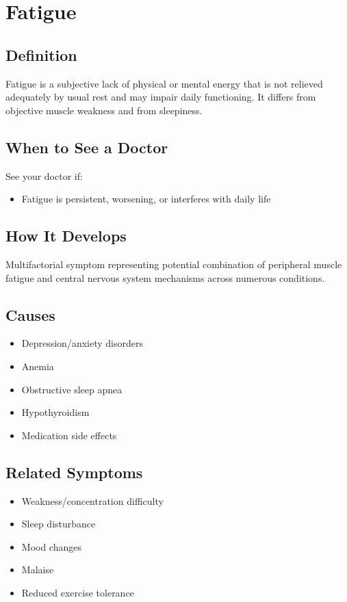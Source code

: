\chapter{Fatigue}

\section*{Definition}
Fatigue is a subjective lack of physical or mental energy that is not relieved adequately by usual rest and may impair daily functioning. It differs from objective muscle weakness and from sleepiness.

\section*{When to See a Doctor}
See your doctor if:
\begin{itemize}
  \item Fatigue is persistent, worsening, or interferes with daily life
\end{itemize}

\section*{How It Develops}
Multifactorial symptom representing potential combination of peripheral muscle fatigue and central nervous system mechanisms across numerous conditions.

\section*{Causes}
\begin{itemize}
  \item Depression/anxiety disorders
  \item Anemia
  \item Obstructive sleep apnea
  \item Hypothyroidism
  \item Medication side effects
\end{itemize}

\section*{Related Symptoms}
\begin{itemize}
  \item Weakness/concentration difficulty
  \item Sleep disturbance
  \item Mood changes
  \item Malaise
  \item Reduced exercise tolerance
\end{itemize}

